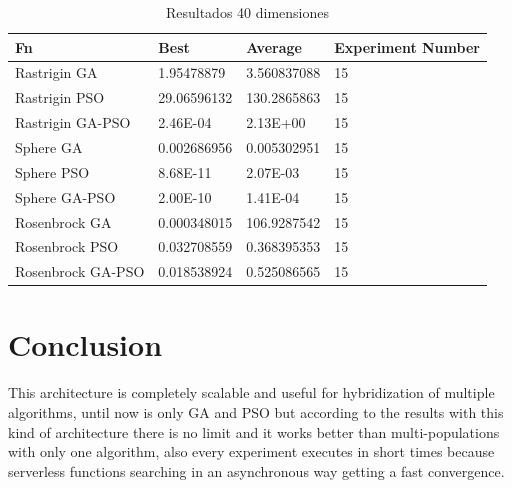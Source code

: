 \documentclass[runningheads]{llncs}
\begin{document}

            \begin{table}[htp]
              \caption{Resultados 40 dimensiones}
              \label{table:resultados-2}
              \centering
              \begin{tabular}{|l|l|l|l|}
              \hline
              Fn & Best & Average & Experiment Number \\
              \hline
              \hline
              Rastrigin GA & 1.95478879 & 3.560837088 & 15\\
              \hline
              Rastrigin PSO & 29.06596132 & 130.2865863 & 15\\
              \hline
              Rastrigin GA-PSO & 2.46E-04 & 2.13E+00 & 15\\
              \hline
              Sphere GA & 0.002686956 & 0.005302951 & 15\\
              \hline
              Sphere PSO & 8.68E-11 & 2.07E-03 & 15\\
              \hline
              Sphere GA-PSO & 2.00E-10 & 1.41E-04 & 15\\
              \hline
              Rosenbrock GA & 0.000348015 & 106.9287542 & 15\\
              \hline
              Rosenbrock PSO & 0.032708559 & 0.368395353 & 15\\
              \hline
              Rosenbrock GA-PSO & 0.018538924 & 0.525086565 & 15\\
              \hline
              \end{tabular}
              \end{table}
%
%
% 
% 
%
\section{Conclusion}

This architecture is completely scalable and useful for hybridization of multiple algorithms,
until now is only GA and PSO but according to the results with this kind of architecture
there is no limit and it works better than multi-populations with only one algorithm, also
every experiment executes in short times because serverless functions searching in an asynchronous way getting a fast convergence.
\end{document}
